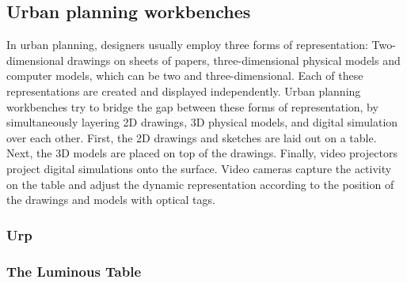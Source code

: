 \subsection{Urban planning workbenches}
In urban planning, designers usually employ three forms of representation: Two-dimensional drawings on sheets of papers, three-dimensional physical models and computer models, which can be two and three-dimensional. Each of these representations are created and displayed independently. Urban planning workbenches try to bridge the gap between these forms of representation, by simultaneously layering 2D drawings, 3D physical models, and digital simulation over each other. 
First, the 2D drawings and sketches are laid out on a table. Next, the 3D models are placed on top of the drawings. Finally, video projectors project digital simulations onto the surface. Video cameras capture the activity on the table and adjust the dynamic representation according to the position of the drawings and models with optical tags. \cite{ishii02}

\subsubsection{Urp}


\subsubsection{The Luminous Table}
